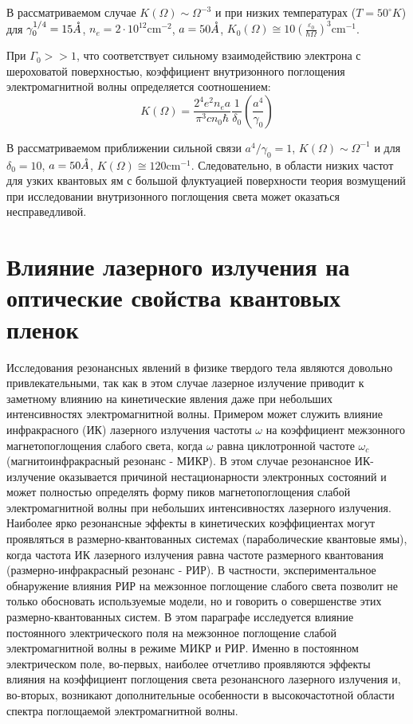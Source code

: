 В рассматриваемом случае $K(\Omega )\sim \Omega ^{-3} $ и при низких температурах ($T=50^{\circ } K$) для $\gamma _{0} ^{1/4} =15 \AA$, $n_{e} =2\cdot 10^{12} \text{cm}^{-2} $, $a=50 \AA$, $K_{0} (\Omega )\cong 10\left(\frac{\varepsilon _{0} }{\hbar \Omega } \right)^{3} \text{cm}^{-1} $.

При $\Gamma _{0} >> 1$, что соответствует сильному взаимодействию электрона с шероховатой поверхностью, коэффициент внутризонного поглощения электромагнитной волны определяется соотношением:
\begin{equation} \label{eq:21_40}
K(\Omega )=\frac{2^{4} e^{2} n_{e} a}{\pi ^{3} cn_{0} \hbar } \frac{1}{\delta _{0} } \left(\frac{a^{4} }{\gamma _{0} } \right)
\end{equation} 

В рассматриваемом приближении сильной связи $a^{4} /\gamma _{0} =1$, $K(\Omega )\sim \Omega ^{-1} $ и для $\delta _{0} =10$, $a=50 \AA$, $K(\Omega )\cong 120 \text{cm}^{-1} $. Следовательно, в области низких частот для узких квантовых ям с большой флуктуацией поверхности теория возмущений при исследовании внутризонного поглощения света может оказаться несправедливой.
	

\section{Влияние лазерного излучения на оптические свойства квантовых пленок} \label{sect2_2}

Исследования резонансных явлений в физике твердого тела являются довольно привлекательными, так как в этом случае лазерное излучение приводит к заметному влиянию на кинетические явления даже при небольших интенсивностях электромагнитной волны. Примером может служить влияние инфракрасного (ИК) лазерного излучения частоты $\omega $ на коэффициент межзонного магнетопоглощения слабого света, когда $\omega $ равна циклотронной частоте $\omega _{c} $ (магнитоинфракрасный резонанс - МИКР). В этом случае резонансное ИК-излучение оказывается причиной нестационарности электронных состояний и может полностью определять форму пиков магнетопоглощения слабой электромагнитной волны при небольших интенсивностях лазерного излучения. Наиболее ярко резонансные эффекты в кинетических коэффициентах могут проявляться в размерно-квантованных системах (параболические квантовые ямы), когда частота ИК лазерного излучения равна частоте размерного квантования (размерно-инфракрасный резонанс - РИР). В частности, экспериментальное обнаружение влияния РИР на межзонное поглощение слабого света позволит не только обосновать используемые модели, но и говорить о совершенстве этих размерно-квантованных систем. В этом параграфе исследуется влияние постоянного электрического поля на межзонное поглощение слабой электромагнитной волны в режиме МИКР и РИР. Именно в постоянном электрическом поле, во-первых, наиболее отчетливо проявляются эффекты влияния на коэффициент поглощения света резонансного лазерного излучения и, во-вторых, возникают дополнительные особенности в высокочастотной области спектра поглощаемой электромагнитной волны.

